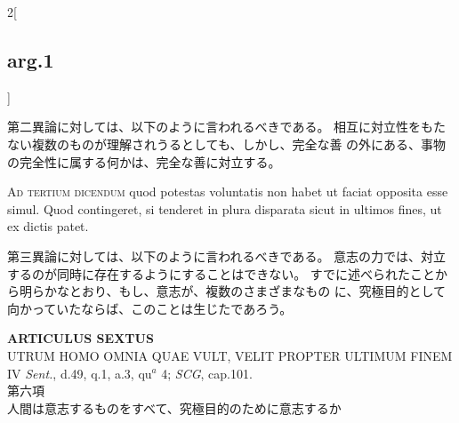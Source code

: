 \documentclass[paper=a4paper,fontsize=10pt,jafontsize=9pt,titlepage]{jlreq}
\begin{document}
\begin{paracol}{2}[\subsection{arg.1}]
\switchcolumn

第二異論に対しては、以下のように言われるべきである。
相互に対立性をもたない複数のものが理解されうるとしても、しかし、完全な善
 の外にある、事物の完全性に属する何かは、完全な善に対立する。

\switchcolumn*[\subsection{ad.3}]

{\scshape Ad tertium dicendum} quod potestas
voluntatis non habet ut faciat opposita esse simul. Quod contingeret, si
tenderet in plura disparata sicut in ultimos fines, ut ex dictis patet.

\switchcolumn

第三異論に対しては、以下のように言われるべきである。
意志の力では、対立するのが同時に存在するようにすることはできない。
すでに述べられたことから明らかなとおり、もし、意志が、複数のさまざまなもの
 に、究極目的として向かっていたならば、このことは生じたであろう。

\end{paracol}
\newpage




{}
\setcounter{section}{6}
\setcounter{subsection}{0}
\begin{center}
 {\Large {\bfseries ARTICULUS SEXTUS}}\\
 {\large UTRUM HOMO OMNIA QUAE VULT, VELIT PROPTER ULTIMUM FINEM}\\
 {\footnotesize IV {\itshape Sent.}, d.49, q.1, a.3, qu$^a$ 4; {\itshape
 SCG}, cap.101.}\\
 {\Large 第六項\\人間は意志するものをすべて、究極目的のために意志するか}
\end{center}
\end{document}
